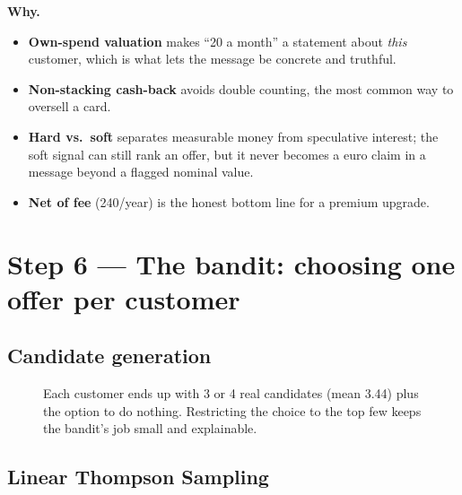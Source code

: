 \documentclass[11pt,a4paper]{article}
\newcommand{\eur}{\texttt{\texteuro}}
\newcommand{\why}[1]{\par\needspace{6\baselineskip}\smallskip\noindent\textbf{\textcolor{ca}{Why.}} #1\par}
\begin{document}
\why{
\begin{itemize}
\item \textbf{Own-spend valuation} makes ``\eur 20 a month'' a statement about \emph{this} customer, which is what lets the message be concrete and truthful.
\item \textbf{Non-stacking cash-back} avoids double counting, the most common way to oversell a card.
\item \textbf{Hard vs.\ soft} separates measurable money from speculative interest; the soft signal can still rank an offer, but it never becomes a euro claim in a message beyond a flagged nominal value.
\item \textbf{Net of fee} (\eur 240/year) is the honest bottom line for a premium upgrade.
\end{itemize}}

\section{Step 6 --- The bandit: choosing one offer per customer}

\subsection{Candidate generation}

\begin{figure}[h]
\centering
{}
\caption{Each customer ends up with 3 or 4 real candidates (mean 3.44) plus the option to do nothing. Restricting the choice to the top few keeps the bandit's job small and explainable.}
\end{figure}

\subsection{Linear Thompson Sampling}
\end{document}

